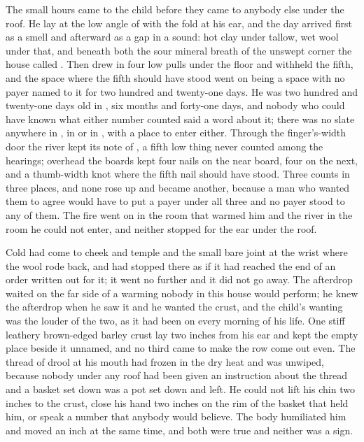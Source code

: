 
The small hours came to the child before they came to anybody else under the roof. He lay at the low angle of  with the fold at his ear, and the day arrived first as a smell and afterward as a gap in a sound: hot clay under tallow, wet wool under that, and beneath both the sour mineral breath of the unswept corner the house called . Then  drew in four low pulls under the floor and withheld the fifth, and the space where the fifth should have stood went on being a space with no payer named to it for two hundred and twenty-one days. He was two hundred and twenty-one days old in , six months and forty-one days, and nobody who could have known what either number counted said a word about it; there was no slate anywhere in , in  or in , with a place to enter either. Through the finger's-width door the river kept its note of , a fifth low thing never counted among the hearings; overhead the boards kept four nails on the near board, four on the next, and a thumb-width knot where the fifth nail should have stood. Three counts in three places, and none rose up and became another, because a man who wanted them to agree would have to put a payer under all three and no payer stood to any of them. The fire went on in the room that warmed him and the river in the room he could not enter, and neither stopped for the ear under the roof.

Cold had come to cheek and temple and the small bare joint at the wrist where the wool rode back, and had stopped there as if it had reached the end of an order written out for it; it went no further and it did not go away. The afterdrop waited on the far side of a warming nobody in this house would perform; he knew the afterdrop when he saw it and he wanted the crust, and the child's wanting was the louder of the two, as it had been on every morning of his life. One stiff leathery brown-edged barley crust lay two inches from his ear and kept the empty place beside it unnamed, and no third came to make the row come out even. The thread of drool at his mouth had frozen in the dry heat and was unwiped, because nobody under any roof had been given an instruction about the thread and a basket set down was a pot set down and left. He could not lift his chin two inches to the crust, close his hand two inches on the rim of the basket that held him, or speak a number that anybody would believe. The body humiliated him and moved an inch at the same time, and both were true and neither was a sign.

